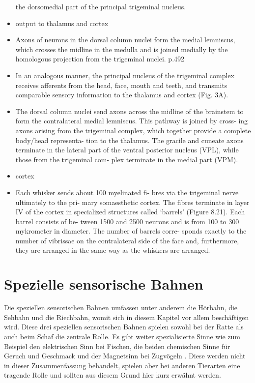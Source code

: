 \documentclass[12pt,a4paper,pdftex]{article}
\begin{document}
\begin{itemize}
the dorsomedial part of the principal trigeminal nucleus.
\\
\item output to thalamus and cortex
\item Axons of neurons in the dorsal column nuclei form the medial lemniscus, which crosses the midline in the medulla and is joined medially by the homologous projection from the trigeminal nuclei. \cite{kandel2013principles} p.492
\item In an
analogous manner, the principal nucleus of the trigeminal
complex receives afferents from the head, face, mouth and
teeth, and transmits comparable sensory information to the
thalamus and cortex (Fig. 3A).
\item The dorsal column nuclei send axons across the
midline of the brainstem to form the contralateral
medial lemniscus. This pathway is joined by cross-
ing axons arising from the trigeminal complex, which
together provide a complete body/head representa-
tion to the thalamus. The gracile and cuneate axons
terminate in the lateral part of the ventral posterior
nucleus (VPL), while those from the trigeminal com-
plex terminate in the medial part (VPM).
\\
\item cortex
\item Each whisker sends about 100 myelinated fi-
bres via the trigeminal nerve ultimately to the pri-
mary somaesthetic cortex. The fibres terminate in
layer IV of the cortex in specialized structures called
‘barrels’ (Figure 8.21). Each barrel consists of be-
tween 1500 and 2500 neurons and is from 100 to
300 mykrometer in diameter. The number of barrels corre-
sponds exactly to the number of vibrissae on the
contralateral side of the face and, furthermore, they
are arranged in the same way as the whiskers are
arranged. \cite{smith2008biology}
\end{itemize}


\newpage
\section{Spezielle sensorische Bahnen}
\label{sec:spezsens}
Die speziellen sensorischen Bahnen umfassen unter anderem die Hörbahn, die Sehbahn und die Riechbahn, womit sich in diesem Kapitel vor allem beschäftigen wird. Diese drei speziellen sensorischen Bahnen spielen sowohl bei der Ratte als auch beim Schaf die zentrale Rolle. Es gibt weiter spezialisierte Sinne wie zum Beispiel den elektrischen Sinn bei Fischen, die beiden chemischen Sinne für Geruch und Geschmack und der Magnetsinn bei Zugvögeln \cite{smith2008biology}. Diese werden nicht in dieser Zusammenfassung behandelt, spielen aber bei anderen Tierarten eine tragende Rolle und sollten aus diesem Grund hier kurz erwähnt werden.
\end{document}
